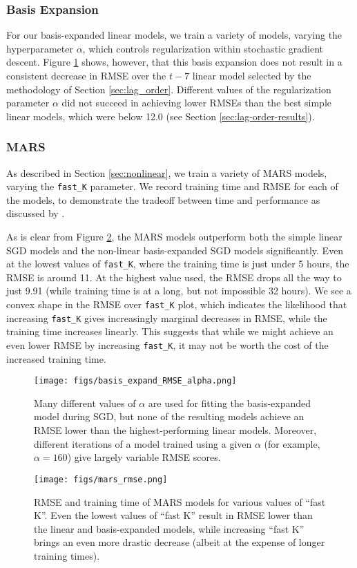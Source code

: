 \documentclass[master]{subfiles}
\begin{document}
\subsubsection{Basis Expansion}
For our basis-expanded linear models, we train a variety of models, varying the hyperparameter $\alpha$, which controls regularization within stochastic gradient descent.  Figure \ref{fig:basis_results} shows, however, that this basis expansion does not result in a consistent decrease in RMSE over the $t-7$ linear model selected by the methodology of Section \ref{sec:lag_order}.  Different values of the regularization parameter $\alpha$ did not succeed in achieving lower RMSEs than the best simple linear models, which were below 12.0 (see Section \ref{sec:lag-order-results}).
\subsubsection{MARS}
As described in Section \ref{sec:nonlinear}, we train a variety of MARS models, varying the \lstinline{fast_K} parameter.  We record training time and RMSE for each of the models, to demonstrate the tradeoff between time and performance as discussed by \cite{earth}.\par
As is clear from Figure \ref{fig:mars_rmse}, the MARS models outperform both the simple linear SGD models and the non-linear basis-expanded SGD models significantly.  Even at the lowest values of \lstinline{fast_K}, where the training time is just under 5 hours, the RMSE is around 11.  At the highest value used, the RMSE drops all the way to just 9.91 (while training time is at a long, but not impossible 32 hours).  We see a convex shape in the RMSE over \lstinline{fast_K} plot, which indicates the likelihood that increasing \lstinline{fast_K} gives increasingly marginal decreases in RMSE, while the training time increases linearly.  This suggests that while we might achieve an even lower RMSE by increasing \lstinline{fast_K}, it may not be worth the cost of the increased training time.
\begin{figure}
\centering
\texttt{[image: figs/basis\_expand\_RMSE\_alpha.png]}
\caption{Many different values of $\alpha$ are used for fitting the basis-expanded model during SGD, but none of the resulting models achieve an RMSE lower than the highest-performing linear models.  Moreover, different iterations of a model trained using a given $\alpha$ (for example, $\alpha = 160$) give largely variable RMSE scores.}
\label{fig:basis_results}
\end{figure}
\begin{figure}
\centering
\texttt{[image: figs/mars\_rmse.png]}
\caption{RMSE and training time of MARS models for various values of ``fast K''.  Even the lowest values of ``fast K'' result in RMSE lower than the linear and basis-expanded models, while increasing ``fast K'' brings an even more drastic decrease (albeit at the expense of longer training times).}
\label{fig:mars_rmse}
\end{figure}
\clearpage
\end{document}
